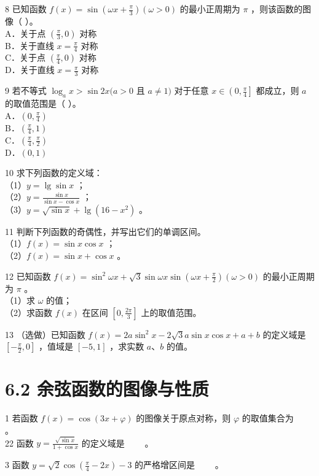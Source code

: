 \documentclass[10pt]{article}
\begin{document}
8 已知函数 \(f(x)=\sin \left(\omega x+\frac{\pi}{3}\right)(\omega>0)\) 的最小正周期为 \(\pi\) ，则该函数的图像（ ）。\\
A．关于点 \(\left(\frac{\pi}{3}, 0\right)\) 对称\\
B．关于直线 \(x=\frac{\pi}{4}\) 对称\\
C．关于点 \(\left(\frac{\pi}{4}, 0\right)\) 对称\\
D．关于直线 \(x=\frac{\pi}{3}\) 对称

9 若不等式 \(\log _{a} x>\sin 2 x(a>0\) 且 \(a \neq 1)\) 对于任意 \(x \in\left(0, \frac{\pi}{4}\right]\) 都成立，则 \(a\) 的取值范围是（ ）。\\
A．\(\left(0, \frac{\pi}{4}\right)\)\\
B．\(\left(\frac{\pi}{4}, 1\right)\)\\
C．\(\left(\frac{\pi}{4}, \frac{\pi}{2}\right)\)\\
D．\((0,1)\)

10 求下列函数的定义域：\\
（1）\(y=\lg \sin x\) ；\\
（2）\(y=\frac{\sin x}{\sin x-\cos x}\) ；\\
（3）\(y=\sqrt{\sin x}+\lg \left(16-x^{2}\right)\) 。

11 判断下列函数的奇偶性，并写出它们的单调区间。\\
（1）\(f(x)=\sin x \cos x\) ；\\
（2）\(f(x)=\sin x+\cos x\) 。

12 已知函数 \(f(x)=\sin ^{2} \omega x+\sqrt{3} \sin \omega x \sin \left(\omega x+\frac{\pi}{2}\right)(\omega>0)\) 的最小正周期为 \(\pi\) 。\\
（1）求 \(\omega\) 的值；\\
（2）求函数 \(f(x)\) 在区间 \(\left[0, \frac{2 \pi}{3}\right]\) 上的取值范围。

13 （选做）已知函数 \(f(x)=2 a \sin ^{2} x-2 \sqrt{3} a \sin x \cos x+a+b\) 的定义域是 \(\left[-\frac{\pi}{2}, 0\right]\) ，值域是 \([-5,1]\) ，求实数 \(a 、 b\) 的值。

\section*{6.2 余弦函数的图像与性质}
1 若函数 \(f(x)=\cos (3 x+\varphi)\) 的图像关于原点对称，则 \(\varphi\) 的取值集合为 \(\qquad\)。\\
22 函数 \(y=\frac{\sqrt{\sin x}}{1+\cos x}\) 的定义域是 \(\qquad\)。

3 函数 \(y=\sqrt{2} \cos \left(\frac{\pi}{4}-2 x\right)-3\) 的严格增区间是 \(\qquad\)。
\end{document}
